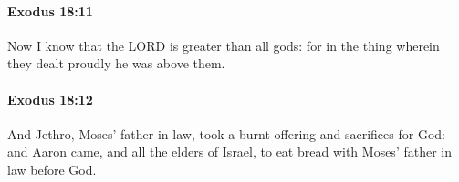 		\paragraph{Exodus 18:11} %
			\label{EXODUS-18-11}

			Now I know that the LORD is greater than all gods: for in the thing wherein they dealt proudly he was above them.


		\paragraph{Exodus 18:12} %
			\label{EXODUS-18-12}

			And Jethro, Moses' father in law, took a burnt offering and sacrifices for God: and Aaron came, and all the elders of Israel, to eat bread with Moses' father in law before God.


